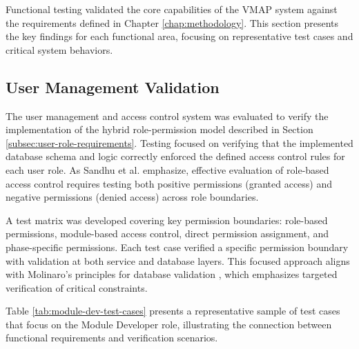 Functional testing validated the core capabilities of the \ac{VMAP} system against the requirements defined in Chapter \ref{chap:methodology}. This section presents the key findings for each functional area, focusing on representative test cases and critical system behaviors.

\subsection{User Management Validation}
\label{subsec:user-management-validation}

The user management and access control system was evaluated to verify the implementation of the hybrid role-permission model described in Section \ref{subsec:user-role-requirements}. Testing focused on verifying that the implemented database schema and logic correctly enforced the defined access control rules for each user role. As Sandhu et al. \cite{sandhu1998role} emphasize, effective evaluation of role-based access control requires testing both positive permissions (granted access) and negative permissions (denied access) across role boundaries.

A test matrix was developed covering key permission boundaries: role-based permissions, module-based access control, direct permission assignment, and phase-specific permissions. Each test case verified a specific permission boundary with validation at both service and database layers. This focused approach aligns with Molinaro's principles for database validation \cite{molinaro2005sql}, which emphasizes targeted verification of critical constraints.

Table \ref{tab:module-dev-test-cases} presents a representative sample of test cases that focus on the Module Developer role, illustrating the connection between functional requirements and verification scenarios.

